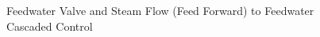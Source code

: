     \begin{figure}[ht]
        \begin{center}
            \caption{Feedwater Valve and Steam Flow (Feed Forward) to Feedwater Cascaded Control}
            \label{fig:PID_Feedwater_PressStep_Control}    
        \end{center}
    \end{figure}   %
    
